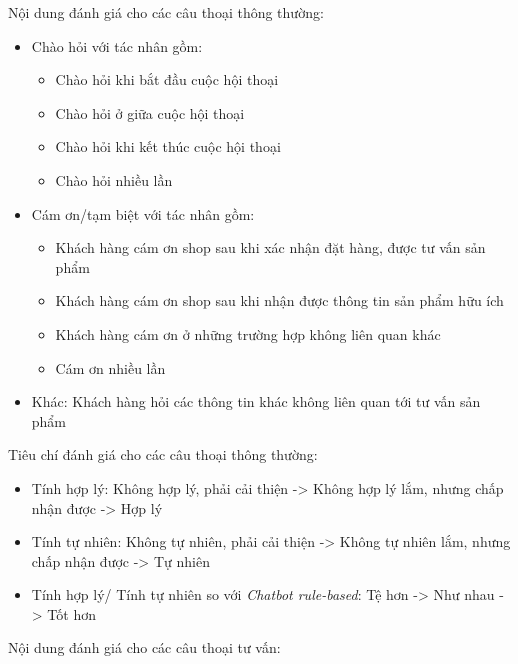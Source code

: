 Nội dung đánh giá cho các câu thoại thông thường:

\begin{itemize}
    \item Chào hỏi với tác nhân gồm: 
    \begin{itemize}
        \item Chào hỏi khi bắt đầu cuộc hội thoại
        \item Chào hỏi ở giữa cuộc hội thoại
        \item Chào hỏi khi kết thúc cuộc hội thoại
        \item Chào hỏi nhiều lần
    \end{itemize}
    \item Cám ơn/tạm biệt với tác nhân gồm: 
    \begin{itemize}
        \item Khách hàng cám ơn shop sau khi xác nhận đặt hàng, được tư vấn sản phẩm
        \item Khách hàng cám ơn shop sau khi nhận được thông tin sản phẩm hữu ích
        \item Khách hàng cám ơn ở những trường hợp không liên quan khác
        \item Cám ơn nhiều lần
    \end{itemize}
    \item Khác: Khách hàng hỏi các thông tin khác không liên quan tới tư vấn sản phẩm
\end{itemize}

Tiêu chí đánh giá cho các câu thoại thông thường:

\begin{itemize}
    \item Tính hợp lý: Không hợp lý, phải cải thiện -> Không hợp lý lắm, nhưng chấp nhận được -> Hợp lý
    \item Tính tự nhiên: Không tự nhiên, phải cải thiện -> Không tự nhiên lắm, nhưng chấp nhận được -> Tự nhiên
    \item Tính hợp lý/ Tính tự nhiên so với \textit{Chatbot rule-based}: Tệ hơn -> Như nhau -> Tốt hơn
\end{itemize}

Nội dung đánh giá cho các câu thoại tư vấn:

